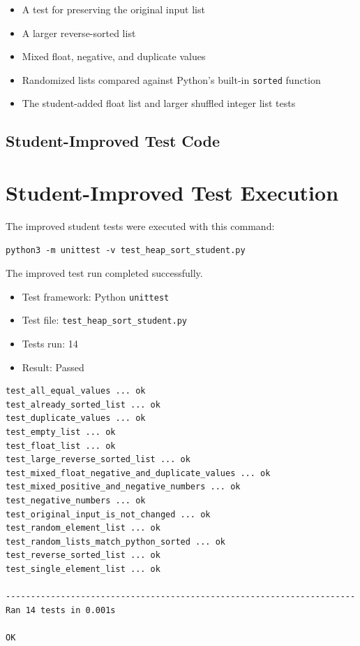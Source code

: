\documentclass[11pt]{article}
\begin{document}
\begin{itemize}
    \item A test for preserving the original input list
    \item A larger reverse-sorted list
    \item Mixed float, negative, and duplicate values
    \item Randomized lists compared against Python's built-in \texttt{sorted} function
    \item The student-added float list and larger shuffled integer list tests
\end{itemize}

\subsection{Student-Improved Test Code}



\section{Student-Improved Test Execution}

The improved student tests were executed with this command:

\begin{lstlisting}[style=code]
python3 -m unittest -v test_heap_sort_student.py
\end{lstlisting}

The improved test run completed successfully.

\begin{itemize}
    \item Test framework: Python \texttt{unittest}
    \item Test file: \texttt{test\_heap\_sort\_student.py}
    \item Tests run: 14
    \item Result: Passed
\end{itemize}

\begin{lstlisting}[style=code]
test_all_equal_values ... ok
test_already_sorted_list ... ok
test_duplicate_values ... ok
test_empty_list ... ok
test_float_list ... ok
test_large_reverse_sorted_list ... ok
test_mixed_float_negative_and_duplicate_values ... ok
test_mixed_positive_and_negative_numbers ... ok
test_negative_numbers ... ok
test_original_input_is_not_changed ... ok
test_random_element_list ... ok
test_random_lists_match_python_sorted ... ok
test_reverse_sorted_list ... ok
test_single_element_list ... ok

----------------------------------------------------------------------
Ran 14 tests in 0.001s

OK
\end{lstlisting}
\end{document}
